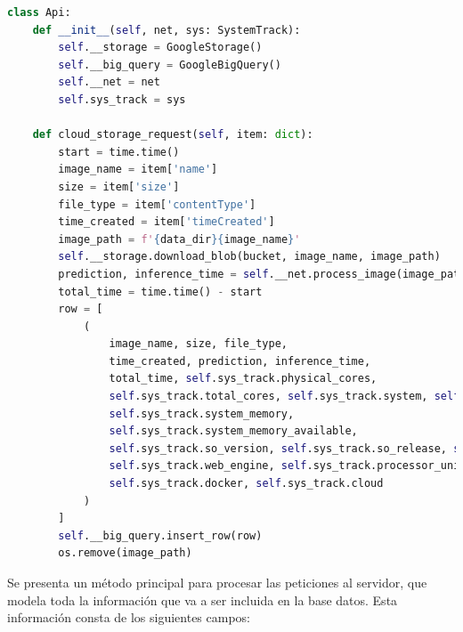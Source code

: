 \begin{lstlisting}[caption=Código Python para la API de la aplicación.,
      label=c_label,
      language=Python,label={example3}]
    class Api:
    def __init__(self, net, sys: SystemTrack):
        self.__storage = GoogleStorage()
        self.__big_query = GoogleBigQuery()
        self.__net = net
        self.sys_track = sys

    def cloud_storage_request(self, item: dict):
        start = time.time()
        image_name = item['name']
        size = item['size']
        file_type = item['contentType']
        time_created = item['timeCreated']
        image_path = f'{data_dir}{image_name}'
        self.__storage.download_blob(bucket, image_name, image_path)
        prediction, inference_time = self.__net.process_image(image_path)
        total_time = time.time() - start
        row = [
            (
                image_name, size, file_type,
                time_created, prediction, inference_time,
                total_time, self.sys_track.physical_cores,
                self.sys_track.total_cores, self.sys_track.system, self.sys_track.processor,
                self.sys_track.system_memory,
                self.sys_track.system_memory_available,
                self.sys_track.so_version, self.sys_track.so_release, self.sys_track.inference_engine,
                self.sys_track.web_engine, self.sys_track.processor_unit,
                self.sys_track.docker, self.sys_track.cloud
            )
        ]
        self.__big_query.insert_row(row)
        os.remove(image_path)
\end{lstlisting}


Se presenta un método principal para procesar las peticiones al servidor, que modela toda la información que va a ser incluida en la base datos.
Esta información consta de los siguientes campos:

